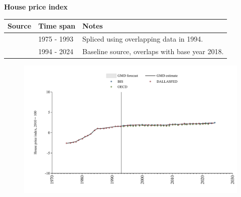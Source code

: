 \documentclass[12pt,a4paper,landscape]{article}
\begin{document}
\begin{adjustbox}{max totalsize={\paperwidth}{\paperheight},center}
\begin{minipage}[t][\textheight][t]{\textwidth}
\vspace*{0.5cm}
{}
\begin{center}
{\Large\bfseries House price index}
\end{center}
\vspace{0.5cm}
\begin{table}[H]
\centering
\small
\begin{tabular}{|l|l|l|}
\hline
\textbf{Source} & \textbf{Time span} & \textbf{Notes} \\
\hline
\rowcolor{white}\cite{DALLASFED}& 1975 - 1993 &Spliced using overlapping data in 1994. \\
\rowcolor{lightgray}\cite{BIS}& 1994 - 2024 &Baseline source, overlaps with base year 2018. \\
\hline
\end{tabular}
\end{table}
\begin{figure}[H]
\centering
\includegraphics[width=\textwidth,height=0.6\textheight,keepaspectratio]{graphs/ISR_HPI.pdf}
\end{figure}
\end{minipage}
\end{adjustbox}
\end{document}
